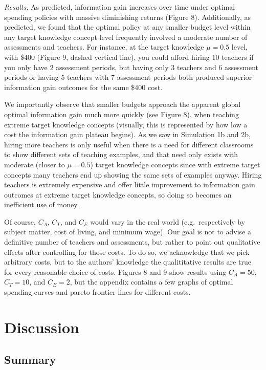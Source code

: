 \documentclass[10pt, letterpaper]{apa6}
\begin{document}
\emph{Results. } As predicted, information gain increases over time
under optimal spending policies with massive diminishing returns (Figure
8). Additionally, as predicted, we found that the optimal policy at any
smaller budget level within any target knowledge concept level
frequently involved a moderate number of assessments and teachers. For
instance, at the target knowledge \(\mu = 0.5\) level, with \$400
(Figure 9, dashed vertical line), you could afford hiring 10 teachers if
you only have 2 assessment periods, but having only 3 teachers and 6
assessment periods or having 5 teachers with 7 assessment periods both
produced superior information gain outcomes for the same \$400 cost.

We importantly observe that smaller budgets approach the apparent global
optimal information gain much more quickly (see Figure 8). when teaching
extreme target knowledge concepts (visually, this is represented by how
low a cost the information gain plateau begins). As we saw in Simulation
1b and 2b, hiring more teachers is only useful when there is a need for
different classrooms to show different sets of teaching examples, and
that need only exists with moderate (closer to \(\mu = 0.5\)) target
knowledge concepts since with extreme target concepts many teachers end
up showing the same sets of examples anyway. Hiring teachers is
extremely expensive and offer little improvement to information gain
outcomes at extreme target knowledge concepts, so doing so becomes an
inefficient use of money.

Of course, \(C_A\), \(C_T\), and \(C_E\) would vary in the real world
(e.g.~respectively by subject matter, cost of living, and minimum wage).
Our goal is not to advise a definitive number of teachers and
assessments, but rather to point out qualitative effects after
controlling for those costs. To do so, we acknowledge that we pick
arbitrary costs, but to the authors' knowledge the qualititative results
are true for every reasonable choice of costs. Figures 8 and 9 show
results using \(C_A = 50\), \(C_T = 10\), and \(C_E = 2\), but the
appendix contains a few graphs of optimal spending curves and pareto
frontier lines for different costs.

\section{Discussion}\label{discussion}

\subsection{Summary}\label{summary}
\end{document}
